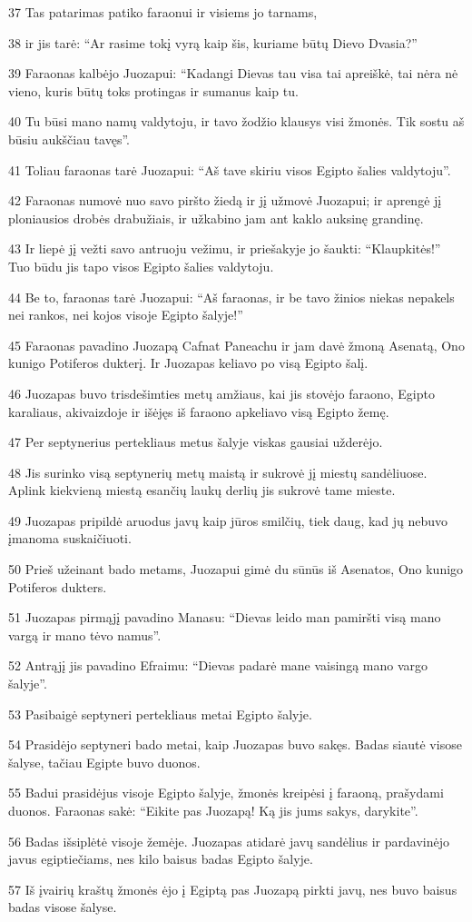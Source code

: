\par 37 Tas patarimas patiko faraonui ir visiems jo tarnams, 
\par 38 ir jis tarė: “Ar rasime tokį vyrą kaip šis, kuriame būtų Dievo Dvasia?” 
\par 39 Faraonas kalbėjo Juozapui: “Kadangi Dievas tau visa tai apreiškė, tai nėra nė vieno, kuris būtų toks protingas ir sumanus kaip tu. 
\par 40 Tu būsi mano namų valdytoju, ir tavo žodžio klausys visi žmonės. Tik sostu aš būsiu aukščiau tavęs”. 
\par 41 Toliau faraonas tarė Juozapui: “Aš tave skiriu visos Egipto šalies valdytoju”. 
\par 42 Faraonas numovė nuo savo piršto žiedą ir jį užmovė Juozapui; ir aprengė jį ploniausios drobės drabužiais, ir užkabino jam ant kaklo auksinę grandinę. 
\par 43 Ir liepė jį vežti savo antruoju vežimu, ir priešakyje jo šaukti: “Klaupkitės!” Tuo būdu jis tapo visos Egipto šalies valdytoju. 
\par 44 Be to, faraonas tarė Juozapui: “Aš faraonas, ir be tavo žinios niekas nepakels nei rankos, nei kojos visoje Egipto šalyje!” 
\par 45 Faraonas pavadino Juozapą Cafnat Paneachu ir jam davė žmoną Asenatą, Ono kunigo Potiferos dukterį. Ir Juozapas keliavo po visą Egipto šalį. 
\par 46 Juozapas buvo trisdešimties metų amžiaus, kai jis stovėjo faraono, Egipto karaliaus, akivaizdoje ir išėjęs iš faraono apkeliavo visą Egipto žemę. 
\par 47 Per septynerius pertekliaus metus šalyje viskas gausiai užderėjo. 
\par 48 Jis surinko visą septynerių metų maistą ir sukrovė jį miestų sandėliuose. Aplink kiekvieną miestą esančių laukų derlių jis sukrovė tame mieste. 
\par 49 Juozapas pripildė aruodus javų kaip jūros smilčių, tiek daug, kad jų nebuvo įmanoma suskaičiuoti. 
\par 50 Prieš užeinant bado metams, Juozapui gimė du sūnūs iš Asenatos, Ono kunigo Potiferos dukters. 
\par 51 Juozapas pirmąjį pavadino Manasu: “Dievas leido man pamiršti visą mano vargą ir mano tėvo namus”. 
\par 52 Antrąjį jis pavadino Efraimu: “Dievas padarė mane vaisingą mano vargo šalyje”. 
\par 53 Pasibaigė septyneri pertekliaus metai Egipto šalyje. 
\par 54 Prasidėjo septyneri bado metai, kaip Juozapas buvo sakęs. Badas siautė visose šalyse, tačiau Egipte buvo duonos. 
\par 55 Badui prasidėjus visoje Egipto šalyje, žmonės kreipėsi į faraoną, prašydami duonos. Faraonas sakė: “Eikite pas Juozapą! Ką jis jums sakys, darykite”. 
\par 56 Badas išsiplėtė visoje žemėje. Juozapas atidarė javų sandėlius ir pardavinėjo javus egiptiečiams, nes kilo baisus badas Egipto šalyje. 
\par 57 Iš įvairių kraštų žmonės ėjo į Egiptą pas Juozapą pirkti javų, nes buvo baisus badas visose šalyse.



